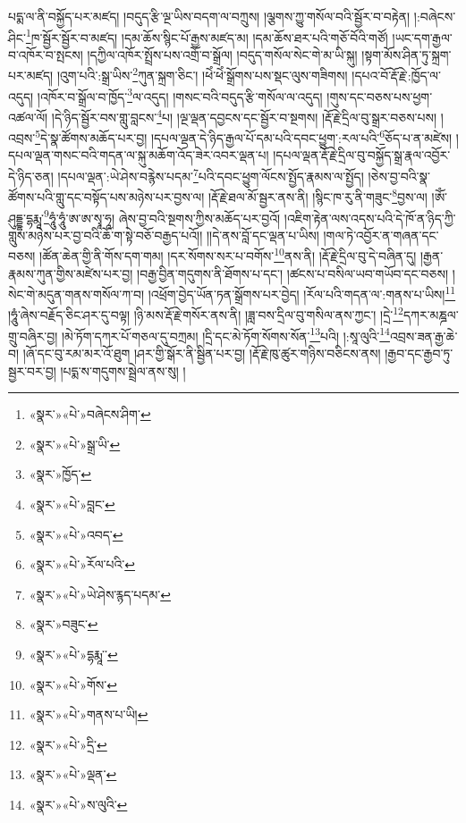 པདྨ་ལ་ནི་བསྐྱོད་པར་མཛད། །བདུད་རྩི་ལྔ་ཡིས་བདག་ལ་བཀྲུས། །ལྕགས་ཀྱུ་གསོལ་བའི་སྦྱོར་བ་བརྟེན། །:བཞེངས་ཤིང་\footnote{«སྣར་»«པེ་»བཞེངས་ཤིག་}ཁ་སྦྱོར་སྦྱོར་བ་མཛད། །དམ་ཆོས་སྙིང་པོ་རྒྱས་མཛད་མ། །དམ་ཆོས་ཐར་པའི་གཅོ་བོའི་གཙོ། །ཡང་དག་རྒྱལ་བ་འཁོར་བ་སྤངས། །དཀྱིལ་འཁོར་སྤྲོས་པས་འགྲོ་བ་སྒྲོལ། །བདུད་གསོལ་སེང་གེ་མ་ཡི་སྐུ། །སྟག་མོས་ཤིན་ཏུ་སྐྲག་པར་མཛད། །འུག་པའི་:སྒྲ་ཡིས་\footnote{«སྣར་»«པེ་»སྒྲ་ཡི་}ཀུན་སྐྲག་ཅིང་། །ཕེཾ་ཕེཾ་སྒྲོགས་པས་སྡང་ལུས་གཟིགས། །དཔའ་བོ་རྡོ་རྗེ་:ཁྱོད་ལ་འདུད། །འཁོར་བ་སྒྲོལ་བ་ཁྱོད་\footnote{«སྣར་»ཁྱོད་}ལ་འདུད། །གསང་བའི་བདུད་རྩི་གསོལ་ལ་འདུད། །གུས་དང་བཅས་པས་ཕྱག་འཚལ་ལོ། །དེ་ཉིད་སྦྱོར་བས་གླུ་བླངས་\footnote{«སྣར་»«པེ་»བླང་}པ། །ལྔ་ལྡན་དབྱངས་དང་སྦྱོར་བ་སྔགས། །རྡོ་རྗེ་དྲིལ་བུ་སྒྲར་བཅས་པས། །འབྲས་\footnote{«སྣར་»«པེ་»འབད་}དེ་སྣ་ཚོགས་མཆོད་པར་བྱ། །དཔལ་ལྡན་དེ་ཉིད་རྒྱལ་པོ་དམ་པའི་དབང་ཕྱུག་:རལ་པའི་\footnote{«སྣར་»«པེ་»རོལ་པའི་}ཅོད་པ་ན་མཛེས། །དཔལ་ལྡན་གསང་བའི་གདན་ལ་སྐུ་མཆོག་འོད་ཟེར་འབར་ལྡན་པ། །དཔལ་ལྡན་རྡོ་རྗེ་དྲིལ་བུ་བསྐྱོད་སྒྲ་རྣལ་འབྱོར་དེ་ཉིད་ཅན། །དཔལ་ལྡན་:ཡེ་ཤེས་བརྙེས་པདམ་\footnote{«སྣར་»«པེ་»ཡེ་ཤེས་རྙད་པདམ་}པའི་དབང་ཕྱུག་ལོངས་སྤྱོད་རྣམས་ལ་སྤྱོད། །ཅེས་བྱ་བའི་སྣ་ཚོགས་པའི་གླུ་དང་བསྟོད་པས་མཉེས་པར་བྱས་ལ། །རྡོ་རྗེ་ཐལ་མོ་སྦྱར་ནས་ནི། །སྙིང་ཁ་རུ་ནི་གཟུང་\footnote{«སྣར་»བཟུང་}བྱས་ལ། །ཨོཾ་ཤུདྡྷ་དྷརྨཱ་\footnote{«སྣར་»«པེ་»དྷརྨཱ་་}ཧཱུཾ་ཧཱུཾ་ཨ་ཨ་སྭཱ་ཧཱ། ཞེས་བྱ་བའི་སྔགས་ཀྱིས་མཆོད་པར་བྱའོ། །འཇིག་རྟེན་ལས་འདས་པའི་དེ་ཁོ་ན་ཉིད་ཀྱི་གླུས་མཉེས་པར་བྱ་བའི་ཆོ་ག་སྟེ་བཅོ་བརྒྱད་པའོ།། །།དེ་ནས་བློ་དང་ལྡན་པ་ཡིས། །གལ་ཏེ་འབྱོར་ན་གཞན་དང་བཅས། །ཚོན་ཆེན་གྱི་ནི་གོས་དག་གམ། །དར་སོགས་སར་པ་བགོས་\footnote{«སྣར་»«པེ་»གོས་}ནས་ནི། །རྡོ་རྗེ་དྲིལ་བུ་དེ་བཞིན་དུ། །རྒྱན་རྣམས་ཀུན་གྱིས་མཛེས་པར་བྱ། །བརྒྱ་བྱིན་གདུགས་ནི་ཐོགས་པ་དང་། །ཚངས་པ་བསིལ་ཡབ་གཡོབ་དང་བཅས། །སེང་གེ་མདུན་གནས་གསོལ་ཀ་བ། །འཕྲོག་བྱེད་ཡོན་ཏན་སྒྲོགས་པར་བྱེད། །རོལ་པའི་གདན་ལ་:གནས་པ་ཡིས།\footnote{«སྣར་»«པེ་»གནས་པ་ཡི།} །ཧཱུཾ་ཞེས་བརྗོད་ཅིང་ཤར་དུ་བལྟ། །ཉི་མས་རྡོ་རྗེ་གསོར་ནས་ནི། །ཟླ་བས་དྲིལ་བུ་གསིལ་ནས་ཀྱང་། །དྲེ་\footnote{«སྣར་»«པེ་»དྲི་}དཀར་མཎྜལ་གྲུ་བཞིར་བྱ། །མེ་ཏོག་དཀར་པོ་གཅལ་དུ་བཀྲམ། །དྲི་དང་མེ་ཏོག་སོགས་སོན་\footnote{«སྣར་»«པེ་»ལྡན་}པའི། །:སཱ་ལུའི་\footnote{«སྣར་»«པེ་»ས་ལུའི་}འབྲས་ཟན་རྒྱ་ཆེ་བ། །ཞོ་དང་བུ་རམ་མར་འོ་ཐུག །ཤར་གྱི་སྒོར་ནི་སྦྱིན་པར་བྱ། །རྡོ་རྗེ་ཁུ་ཚུར་གཉིས་བཅིངས་ནས། །རྒྱབ་དང་རྒྱབ་ཏུ་སྦྱར་བར་བྱ། །པདྨ་ས་གདུགས་སྦྲེལ་ནས་སུ། །
